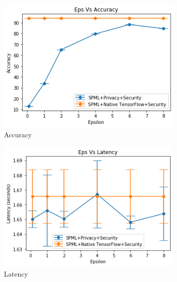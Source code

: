\begin{figure}
\begin{subfigure}{0.5\textwidth}
         \includegraphics[width=\textwidth]{images/Inference/MnistHwAccuracyInference.png}
         \caption{Accuracy}
         \label{fig:appendixhwMnistAccuracyInference}
     \end{subfigure}
     \begin{subfigure}{0.5\textwidth}
         \includegraphics[width=\textwidth]{images/Inference/MnistHwLatencyInference.png}
         \caption{Latency}
         \label{fig:appendixhwMnistLatencyInference}
     \end{subfigure}
        \caption{MNIST Dataset - Inference - Hardware mode with Intel SGX and SCONE}
     \begin{subfigure}{0.5\textwidth}

\end{subfigure}
\end{figure}
